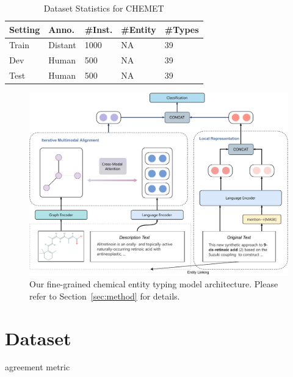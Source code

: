 
\begin{table}
	\caption{Dataset Statistics for CHEMET}
	\centering
	\begin{tabular}{lllll}
		
		\toprule
		Setting &Anno.& \#Inst. & \#Entity  & \#Types \\
		\midrule
		Train &Distant&   1000& NA&39\\
		Dev &Human&500&NA&39\\
		Test&Human&            500&NA&39 \\
		\bottomrule
	\end{tabular}
	\label{datastats}
\end{table}

\begin{figure}[ht]
	\begin{center}
		\centerline{\includegraphics[width=1.8 
			\columnwidth]{model_new.pdf}}
		\caption{Our fine-grained chemical entity typing model architecture. Please refer to Section~\ref{sec:method} for details.}
		\label{fig:framework}
	\end{center}
	\vskip -0.2in
\end{figure}
\section{Dataset}
\label{datacollection}

agreement metric

